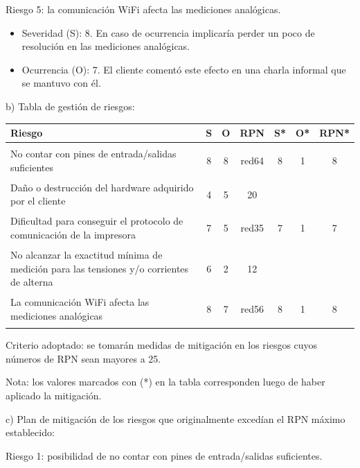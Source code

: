 \documentclass[11pt]{charter}
\begin{document}
Riesgo 5: la comunicación WiFi afecta las mediciones analógicas.
\begin{itemize}
\item Severidad (S): 8. En caso de ocurrencia implicaría perder un poco de resolución en las mediciones analógicas. 
\item Ocurrencia (O): 7. El cliente comentó este efecto en una charla informal que se mantuvo con él.
\end{itemize}


b) Tabla de gestión de riesgos:

\begin{table}[htpb]
\centering
\begin{tabularx}{\linewidth}{@{}|X|c|c|c|c|c|c|@{}}
\hline
\rowcolor[HTML]{C0C0C0} 
Riesgo & S & O & RPN & S* & O* & RPN* \\ \hline
No contar con pines de entrada/salidas suficientes    & 8 & 8 &  \begin{consigna}{red}64\end{consigna} & 8  & 1  &  8   \\ \hline
Daño o destrucción del hardware adquirido por el cliente    & 4 & 5 &  20 &    &    &      \\ \hline
Dificultad para conseguir el protocolo de comunicación de la impresora    & 7 & 5 &  \begin{consigna}{red}35\end{consigna} & 7  & 1  &  7   \\ \hline
No alcanzar la exactitud mínima de medición para las tensiones y/o corrientes de alterna    & 6 & 2 &  12 &    &    &      \\ \hline
La comunicación WiFi afecta las mediciones analógicas    & 8 & 7 &  \begin{consigna}{red}56\end{consigna} & 8  & 1  &  8   \\ \hline
\end{tabularx}%
\end{table}

Criterio adoptado: se tomarán medidas de mitigación en los riesgos cuyos números de RPN sean mayores a 25.

Nota: los valores marcados con (*) en la tabla corresponden luego de haber aplicado la mitigación.

c) Plan de mitigación de los riesgos que originalmente excedían el RPN máximo establecido:
 
Riesgo 1: posibilidad de no contar con pines de entrada/salidas suficientes.
\end{document}
